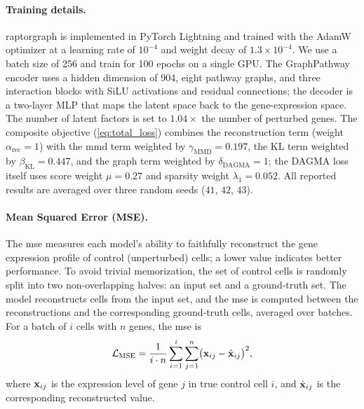 \documentclass[10pt,letterpaper]{article}
\theoremstyle{definition}
\theoremstyle{remark}
\newcommand{\variables}{\rvx}
\newcommand{\observeddim}{n}
\newcommand{\numgenes}{\observeddim}
\newcommand{\mseloss}{\mathcal{L}_{\text{MSE}}}
\newcommand{\alpharec}{\alpha_{\text{rec}}}
\newcommand{\betakl}{\beta_{\text{KL}}}
\newcommand{\gammammd}{\gamma_{\text{MMD}}}
\newcommand{\deltadagma}{\delta_{\text{DAGMA}}}
\newcommand{\numsamplesobs}{i}
\newcommand{\predictedvariable}{\hat{\variables}}
\begin{document}
\paragraph{Training details.}
\gls{raptorgraph} is implemented in PyTorch Lightning and trained with the AdamW optimizer at a learning rate of $10^{-4}$ and weight decay of $1.3\times10^{-4}$.
We use a batch size of 256 and train for 100 epochs on a single GPU.
The GraphPathway encoder uses a hidden dimension of 904, eight pathway graphs, and three interaction blocks with SiLU activations and residual connections; the decoder is a two-layer MLP that maps the latent space back to the gene-expression space.
The number of latent factors is set to $1.04\times$ the number of perturbed genes.
The composite objective (\cref{eq:total_loss}) combines the reconstruction term (weight $\alpharec = 1$) with the \gls{mmd} term weighted by $\gammammd = 0.197$, the KL term weighted by $\betakl = 0.447$, and the graph term weighted by $\deltadagma = 1$; the DAGMA loss itself uses score weight $\mu = 0.27$ and sparsity weight $\lambda_1 = 0.052$.
All reported results are averaged over three random seeds ($41$, $42$, $43$).

\paragraph{Mean Squared Error (MSE).}
The \gls{mse} measures each model's ability to faithfully reconstruct the gene expression profile of control (unperturbed) cells; a lower value indicates better performance.
To avoid trivial memorization, the set of control cells is randomly split into two non-overlapping halves: an input set and a ground-truth set.
The model reconstructs cells from the input set, and the \gls{mse} is computed between the reconstructions and the corresponding ground-truth cells, averaged over batches.
For a batch of $\numsamplesobs$ cells with $\numgenes$ genes, the \gls{mse} is
\begin{equation}
    \mseloss = \frac{1}{\numsamplesobs \cdot \numgenes} \sum_{i=1}^{\numsamplesobs} \sum_{j=1}^{\numgenes} \bigl( \variables_{ij} - \predictedvariable_{ij} \bigr)^2,
    \label{eq:metrics:mse}
\end{equation}
where $\variables_{ij}$ is the expression level of gene $j$ in true control cell $i$, and $\predictedvariable_{ij}$ is the corresponding reconstructed value.
\end{document}
